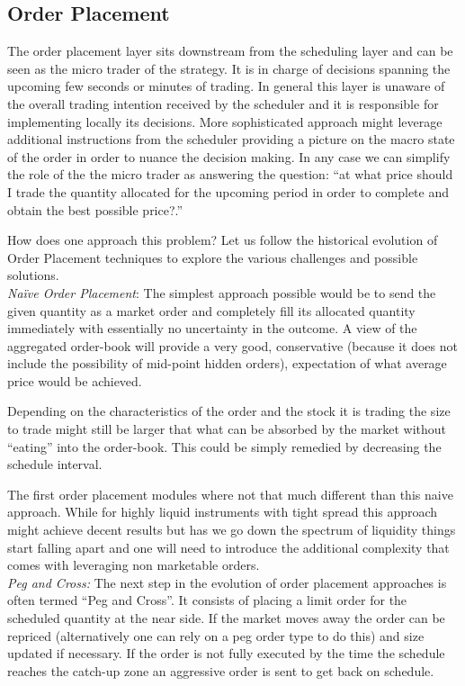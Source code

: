 \subsection{Order Placement}

The order placement layer sits downstream from the scheduling layer and can be seen as the micro trader of the strategy. It is in charge of decisions spanning the upcoming few seconds or minutes of trading. In general this layer is unaware of the overall trading intention received by the scheduler and it is responsible for implementing locally its decisions. More sophisticated approach might leverage  additional instructions from the scheduler providing a picture on the macro state of the order in  order to nuance the decision making. In any case we can simplify the role of the the micro trader as answering the question: ``at what price should I trade the quantity allocated for the upcoming period in order to complete and obtain the best possible price?.'' 


How does one approach this problem? Let us follow the historical evolution of Order Placement techniques to explore the various challenges and possible solutions. \\


\noindent\emph{Na\"ive Order Placement}: The simplest approach possible would be to send the given quantity as a market order and completely fill its allocated quantity immediately with essentially no uncertainty in the outcome. A view of the aggregated order-book will provide a very good, conservative (because it does not include the possibility of mid-point hidden orders), expectation of what average price would be achieved. 


Depending  on the characteristics of the order and the stock it is trading the size to trade might still be larger that what can be absorbed by the market without ``eating'' into the order-book. This could be simply remedied by decreasing the schedule interval.


The first order placement modules where not that much different than this naive approach. While for highly liquid instruments with tight spread this approach might achieve decent results but has we go down the spectrum of liquidity things start falling apart and one will need to introduce the additional complexity that comes with leveraging non marketable orders. \\


\noindent\emph{Peg and Cross:} The next step in the evolution of order placement approaches is often termed ``Peg and Cross''. It consists of placing a limit order  for the scheduled quantity at the near side. If the market moves away the order can be repriced (alternatively one can rely on a peg order type to do this) and size updated if necessary. If the order is not fully executed by the time the schedule reaches the catch-up zone an aggressive order is sent to get back on schedule.


